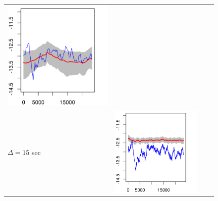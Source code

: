 \documentclass[10pt]{article}
\begin{document}
\begin{figure}
\begin{tabular}{m{0.25cm}ccc}
\begin{minipage}{0.25\textwidth}
				\includegraphics[width=1\linewidth]{results-simulation-10003-bid-ask-noise-plots-VOL-PATHS-microstructure-VOL-PATHS-XI-Inf-dt-3e05-SDs-0.png}
				\end{minipage}  \\
%
		\begin{sideways} $\Delta = 15$ sec \end{sideways}
			& \begin{minipage}{0.25\textwidth}
				\centering
				\includegraphics[width=1\linewidth]{results-simulation-10003-bid-ask-noise-plots-VOL-PATHS-microstructure-VOL-PATHS-XI-0-dt-15000-SDs-0.png}

\end{minipage}
\end{tabular}
\end{figure}
\end{document}
